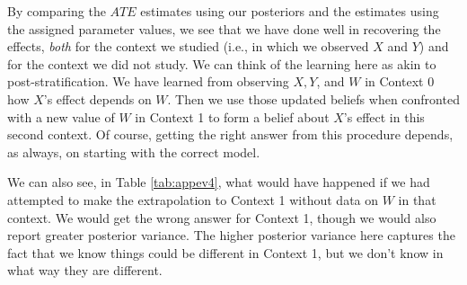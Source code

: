 \documentclass[
  12pt,
]{book}
\begin{document}
By comparing the \(ATE\) estimates using our posteriors and the estimates using the assigned parameter values, we see that we have done well in recovering the effects, \emph{both} for the context we studied (i.e., in which we observed \(X\) and \(Y\)) and for the context we did not study. We can think of the learning here as akin to post-stratification. We have learned from observing \(X, Y\), and \(W\) in Context 0 how \(X\)'s effect depends on \(W\). Then we use those updated beliefs when confronted with a new value of \(W\) in Context 1 to form a belief about \(X\)'s effect in this second context. Of course, getting the right answer from this procedure depends, as always, on starting with the correct model.

We can also see, in Table \ref{tab:appev4}, what would have happened if we had attempted to make the extrapolation to Context 1 without data on \(W\) in that context. We would get the wrong answer for Context 1, though we would also report greater posterior variance. The higher posterior variance here captures the fact that we know things could be different in Context 1, but we don't know in what way they are different.
\end{document}
